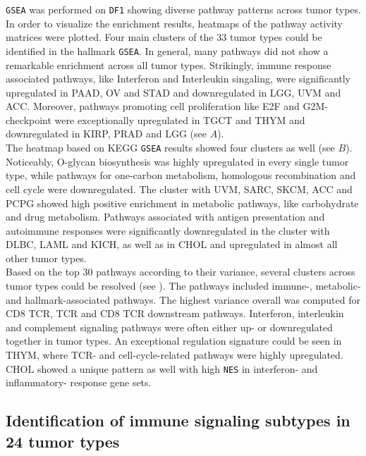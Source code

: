 \documentclass[
  parskip,
  oneside]{scrreprt}
\begin{document}
\texttt{GSEA} was performed on \texttt{DF1} showing diverse pathway
patterns across tumor types. In order to visualize the enrichment
results, heatmaps of the pathway activity matrices were plotted. Four
main clusters of the 33 tumor types could be identified in the hallmark
\texttt{GSEA}. In general, many pathways did not show a remarkable
enrichment across all tumor types. Strikingly, immune response
associated pathways, like Interferon and Interleukin singaling, were
significantly upregulated in PAAD, OV and STAD and downregulated in LGG,
UVM and ACC. Moreover, pathways promoting cell proliferation like E2F
and G2M-checkpoint were exceptionally upregulated in TGCT and THYM and
downregulated in KIRP, PRAD and LGG (see  \(A\)).\\
The heatmap based on KEGG \texttt{GSEA} results showed four clusters as
well (see  \(B\)). Noticeably, O-glycan biosynthesis was
highly upregulated in every single tumor type, while pathways for
one-carbon metabolism, homologous recombination and cell cycle were
downregulated. The cluster with UVM, SARC, SKCM, ACC and PCPG showed
high positive enrichment in metabolic pathways, like carbohydrate and
drug metabolism. Pathways associated with antigen presentation and
autoimmune responses were significantly downregulated in the cluster
with DLBC, LAML and KICH, as well as in CHOL and upregulated in almost
all other tumor types.\\
Based on the top 30 pathways according to their variance, several
clusters across tumor types could be resolved (see ). The
pathways included immune-, metabolic- and hallmark-associated pathways.
The highest variance overall was computed for CD8 TCR, TCR and CD8 TCR
downstream pathways. Interferon, interleukin and complement signaling
pathways were often either up- or downregulated together in tumor types.
An exceptional regulation signature could be seen in THYM, where TCR-
and cell-cycle-related pathways were highly upregulated. CHOL showed a
unique pattern as well with high \texttt{NES} in interferon- and
inflammatory- response gene sets.

\hypertarget{identification-of-immune-signaling-subtypes-in-24-tumor-types}{%
\subsection{Identification of immune signaling subtypes in 24 tumor
types}\label{identification-of-immune-signaling-subtypes-in-24-tumor-types}}
\end{document}
